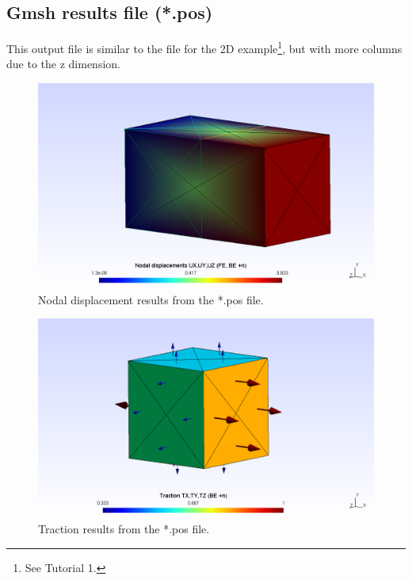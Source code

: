 \documentclass[a4]{article}
\begin{document}
\subsection{Gmsh results file (*.pos)}

This output file is similar to the file for the 2D example\footnote{See Tutorial 1.}, but with more columns due to the z dimension. 

\begin{figure}[h]
	\centering
	\includegraphics[scale = 0.5]{displacement.png}
	\caption{Nodal displacement results from the *.pos file.}
	\label{fig:displacement}
\end{figure}

\begin{figure}
	\centering
	\includegraphics[scale = 0.5]{traction.png}
	\caption{Traction results from the *.pos file.}
	\label{fig:traction}
\end{figure}
\end{document}
